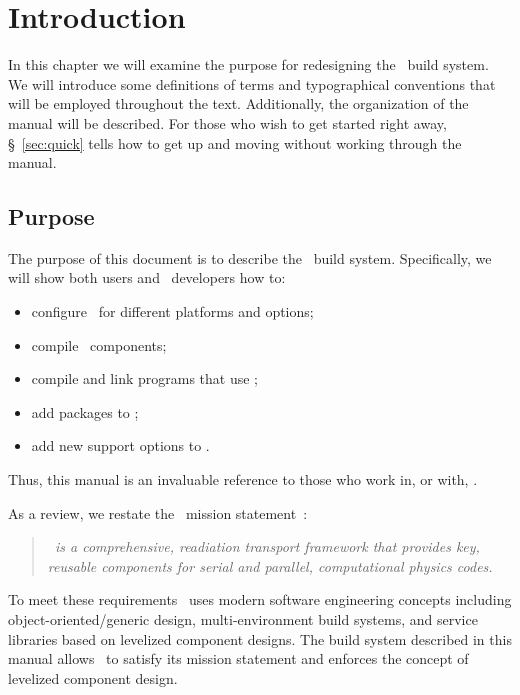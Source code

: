 
\chapter{Introduction}

In this chapter we will examine the purpose for redesigning the
\draco\ build system.  We will introduce some definitions of terms and 
typographical conventions that will be employed throughout the text.
Additionally, the organization of the manual will be described.  For
those who wish to get started right away, \S~\ref{sec:quick} tells how 
to get up and moving without working through the manual.


\section{Purpose}
\label{sec:purpose}

The purpose of this document is to describe the \draco\ build system.
Specifically, we will show both users and \draco\ developers how to: 
\begin{itemize}
\item configure \draco\ for different platforms and options;
\item compile \draco\ components;
\item compile and link programs that use \draco;
\item add packages to \draco;
\item add new support options to \draco.
\end{itemize}
Thus, this manual is an invaluable reference to those who work in, or
with, \draco.

As a review, we restate the \draco\ mission statement~\cite{rn98046}:
\begin{quote}
  \slshape \draco\ is a comprehensive, readiation transport framework
  that provides key, reusable components for serial and parallel,
  computational physics codes.
\end{quote}
To meet these requirements \draco\ uses modern software engineering
concepts including object-oriented/\-generic design, multi-environment
build systems, and service libraries based on levelized component
designs.  The build system described in this manual allows \draco\ to
satisfy its mission statement and enforces the concept of levelized
component design.

